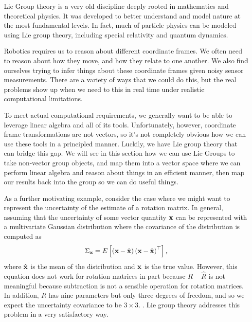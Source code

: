 Lie Group theory is a very old discipline deeply rooted in mathematics
and theoretical physics. It was developed to better understand and
model nature at the most fundamental levels. In fact, much of particle
physics can be modeled using Lie group theory, including special relativity
and quantum dynamics. 

Robotics requires us to reason about different coordinate frames. We often need to
reason about how they move, and how they relate to one another. We
also find ourselves trying to infer things about these coordinate
frames given noisy sensor measurements. There are a variety of ways
that we could do this, but the real problems show up when we need
to this in real time under realistic computational limitations. 

To meet actual computational requirements, we generally want to be
able to leverage linear algebra and all of its tools. Unfortunately,
however, coordinate frame transformations are not vectors, so it's
not completely obvious how we can use these tools in a principled
manner. Luckily, we have Lie group theory that can bridge this gap.
We will see in this section how we can use Lie Groups to take non-vector
group objects, and map them into a vector space where we can perform
linear algebra and reason about things in an efficient manner, then
map our results back into the group so we can do useful things.

As a further motivating example, consider the case where we might
want to represent the uncertainty of the estimate of a rotation matrix.
In general, assuming that the uncertainty of some vector quantity
$\mathbf{x}$ can be represented with a multivariate Gaussian distribution where
the covariance of the distribution is computed as
\[
\Sigma_{\mathbf{x}}=E\left[\left(\mathbf{x}-\hat{\mathbf{x}}\right)\left(\mathbf{x}-\hat{\mathbf{x}}\right)^{\top}\right],
\]
where $\hat{\mathbf{x}}$ is the mean of the distribution and $\mathbf{x}$ is the true value.
However, this equation does not work for rotation matrices in part because $R-\hat{R}$ is not meaningful because subtraction is not a sensible
operation for rotation matrices. In addition, $R$ has nine parameters but only three degrees of freedom, and so we expect the uncertainty covariance to be $3\times 3$.  . Lie group theory addresses this problem in a very satisfactory way.

